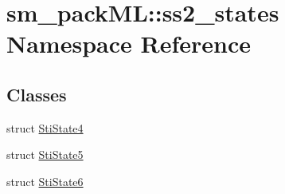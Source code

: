 \hypertarget{namespacesm__packML_1_1ss2__states}{}\section{sm\+\_\+pack\+ML\+:\+:ss2\+\_\+states Namespace Reference}
\label{namespacesm__packML_1_1ss2__states}
\subsection*{Classes}
\begin{DoxyCompactItemize}
\item 
struct \hyperlink{structsm__packML_1_1ss2__states_1_1StiState4}{Sti\+State4}
\item 
struct \hyperlink{structsm__packML_1_1ss2__states_1_1StiState5}{Sti\+State5}
\item 
struct \hyperlink{structsm__packML_1_1ss2__states_1_1StiState6}{Sti\+State6}
\end{DoxyCompactItemize}
